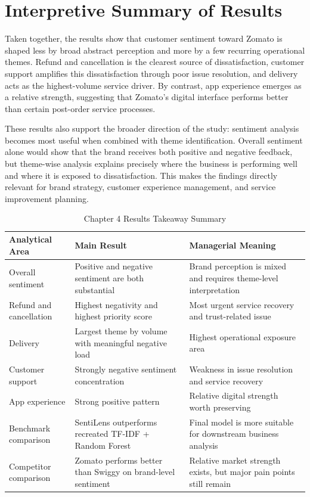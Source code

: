 \section{Interpretive Summary of Results}

Taken together, the results show that customer sentiment toward Zomato is shaped less by broad abstract perception and more by a few recurring operational themes. Refund and cancellation is the clearest source of dissatisfaction, customer support amplifies this dissatisfaction through poor issue resolution, and delivery acts as the highest-volume service driver. By contrast, app experience emerges as a relative strength, suggesting that Zomato's digital interface performs better than certain post-order service processes.

These results also support the broader direction of the study: sentiment analysis becomes most useful when combined with theme identification. Overall sentiment alone would show that the brand receives both positive and negative feedback, but theme-wise analysis explains precisely where the business is performing well and where it is exposed to dissatisfaction. This makes the findings directly relevant for brand strategy, customer experience management, and service improvement planning.

\begin{table}[h]
\centering
\caption{Chapter 4 Results Takeaway Summary}
\small
\begin{tabular}{L{0.22\textwidth}L{0.26\textwidth}L{0.32\textwidth}}
\toprule
\textbf{Analytical Area} & \textbf{Main Result} & \textbf{Managerial Meaning} \\
\midrule
Overall sentiment & Positive and negative sentiment are both substantial & Brand perception is mixed and requires theme-level interpretation \\
Refund and cancellation & Highest negativity and highest priority score & Most urgent service recovery and trust-related issue \\
Delivery & Largest theme by volume with meaningful negative load & Highest operational exposure area \\
Customer support & Strongly negative sentiment concentration & Weakness in issue resolution and service recovery \\
App experience & Strong positive pattern & Relative digital strength worth preserving \\
Benchmark comparison & SentiLens outperforms recreated TF-IDF + Random Forest & Final model is more suitable for downstream business analysis \\
Competitor comparison & Zomato performs better than Swiggy on brand-level sentiment & Relative market strength exists, but major pain points still remain \\
\bottomrule
\end{tabular}
\normalsize
\end{table}

